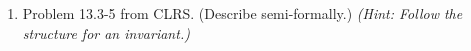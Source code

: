 \documentclass{article}
\begin{document}
\begin{enumerate}
\item Problem 13.3-5 from CLRS. (Describe semi-formally.) \emph{(Hint: Follow the structure for an invariant.)}

\end{enumerate}
\end{document}
